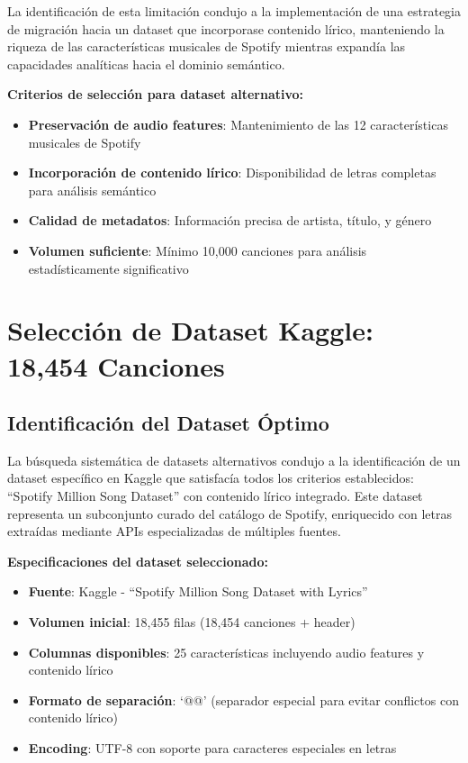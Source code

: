 \documentclass[12pt,a4paper]{report}
\begin{document}
La identificación de esta limitación condujo a la implementación de una estrategia de migración hacia un dataset que incorporase contenido lírico, manteniendo la riqueza de las características musicales de Spotify mientras expandía las capacidades analíticas hacia el dominio semántico.

\textbf{Criterios de selección para dataset alternativo:}
\begin{itemize}[leftmargin=*]
    \item \textbf{Preservación de audio features}: Mantenimiento de las 12 características musicales de Spotify
    \item \textbf{Incorporación de contenido lírico}: Disponibilidad de letras completas para análisis semántico
    \item \textbf{Calidad de metadatos}: Información precisa de artista, título, y género
    \item \textbf{Volumen suficiente}: Mínimo 10,000 canciones para análisis estadísticamente significativo
\end{itemize}

\section{Selección de Dataset Kaggle: 18,454 Canciones}

\subsection{Identificación del Dataset Óptimo}

La búsqueda sistemática de datasets alternativos condujo a la identificación de un dataset específico en Kaggle que satisfacía todos los criterios establecidos: ``Spotify Million Song Dataset'' con contenido lírico integrado. Este dataset representa un subconjunto curado del catálogo de Spotify, enriquecido con letras extraídas mediante APIs especializadas de múltiples fuentes.

\textbf{Especificaciones del dataset seleccionado:}
\begin{itemize}[leftmargin=*]
    \item \textbf{Fuente}: Kaggle - ``Spotify Million Song Dataset with Lyrics''
    \item \textbf{Volumen inicial}: 18,455 filas (18,454 canciones + header)
    \item \textbf{Columnas disponibles}: 25 características incluyendo audio features y contenido lírico
    \item \textbf{Formato de separación}: `@@' (separador especial para evitar conflictos con contenido lírico)
    \item \textbf{Encoding}: UTF-8 con soporte para caracteres especiales en letras
\end{itemize}
\end{document}
